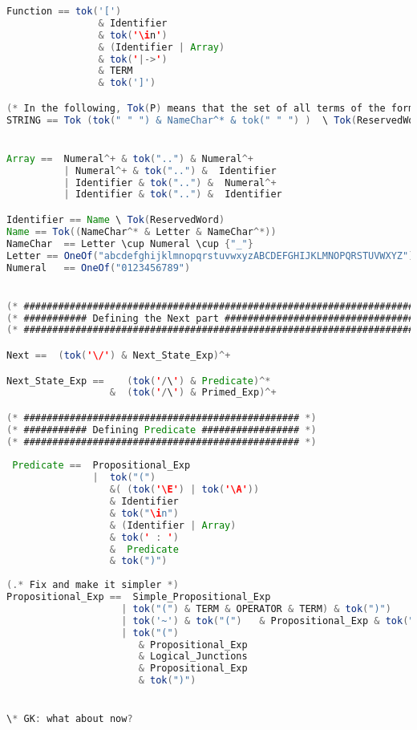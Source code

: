 \documentclass{article}
\theoremstyle{plain}
\numberwithin{equation}{section}
\begin{document}
\begin{lstlisting}[language=java]
Function == tok('[')     
                & Identifier 
                & tok('\in') 
                & (Identifier | Array) 
                & tok('|->') 
                & TERM
                & tok(']') 

(* In the following, Tok(P) means that the set of all terms of the form P  *)
STRING == Tok (tok(" " ") & NameChar^* & tok(" " ") )  \ Tok(ReservedWord) 


Array ==  Numeral^+ & tok("..") & Numeral^+
          | Numeral^+ & tok("..") &  Identifier
          | Identifier & tok("..") &  Numeral^+
          | Identifier & tok("..") &  Identifier

Identifier == Name \ Tok(ReservedWord)
Name == Tok((NameChar^* & Letter & NameChar^*))
NameChar  == Letter \cup Numeral \cup {"_"}  
Letter == OneOf("abcdefghijklmnopqrstuvwxyzABCDEFGHIJKLMNOPQRSTUVWXYZ")
Numeral   == OneOf("0123456789") 


(* ############################################################################################ *)
(* ########### Defining the Next part ######################################################### *)
(* ############################################################################################ *)

Next ==  (tok('\/') & Next_State_Exp)^+

Next_State_Exp ==    (tok('/\') & Predicate)^*
                  &  (tok('/\') & Primed_Exp)^+

(* ################################################ *)
(* ########### Defining Predicate ################# *)
(* ################################################ *)
 
 Predicate ==  Propositional_Exp
               |  tok("(") 
                  &( (tok('\E') | tok('\A')) 
                  & Identifier
                  & tok("\in")
                  & (Identifier | Array) 
                  & tok(' : ') 
                  &  Predicate
                  & tok(")")
                  
(.* Fix and make it simpler *)
Propositional_Exp ==  Simple_Propositional_Exp 
                    | tok("(") & TERM & OPERATOR & TERM) & tok(")")
                    | tok('~') & tok("(")   & Propositional_Exp & tok(")")
                    | tok("(")   
                       & Propositional_Exp  
                       & Logical_Junctions
                       & Propositional_Exp
                       & tok(")")


\* GK: what about now? 




\end{lstlisting}
\end{document}
